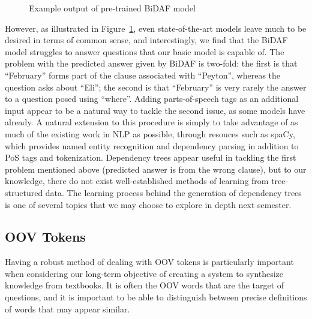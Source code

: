 \documentclass{article}
\begin{document}
\begin{figure}[h]
	\centering
	\qquad
	\caption[caption]{Example output of pre-trained BiDAF model\footnotemark}
	\label{fig:allenDemo}
\end{figure}

However, as illustrated in Figure~\ref{fig:allenDemo}, even state-of-the-art models leave much to be desired in terms of common sense, and interestingly, we find that the BiDAF model struggles to answer questions that our basic model is capable of. The problem with the predicted answer given by BiDAF is two-fold: the first is that ``February'' forms part of the clause associated with ``Peyton'', whereas the question asks about ``Eli''; the second is that ``February'' is very rarely the answer to a question posed using ``where''. Adding parts-of-speech tags as an additional input appear to be a natural way to tackle the second issue, as some models have already. A natural extension to this procedure is simply to take advantage of as much of the existing work in NLP as possible, through resouces such as spaCy\footnotemark{}, which provides named entity recognition and dependency parsing in addition to PoS tags and tokenization. Dependency trees appear useful in tackling the first problem mentioned above (predicted answer is from the wrong clause), but to our knowledge, there do not exist well-established methods of learning from tree-structured data. The learning process behind the generation of dependency trees is one of several topics that we may choose to explore in depth next semester.

\subsection{OOV Tokens}
Having a robust method of dealing with OOV tokens is particularly important when considering our long-term objective of creating a system to synthesize knowledge from textbooks. It is often the OOV words that are the target of questions, and it is important to be able to distinguish between precise definitions of words that may appear similar.
\end{document}
